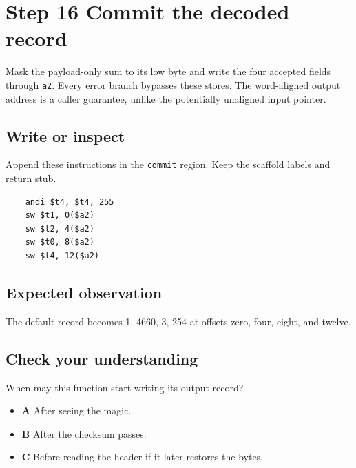 \section{Step 16 Commit the decoded record}\label{packet-s16}

Mask the payload-only sum to its low byte and write the four accepted fields through \texttt{a2}. Every error branch bypasses these stores. The word-aligned output address is a caller guarantee, unlike the potentially unaligned input pointer.

\subsection{Write or inspect}
Append these instructions in the \texttt{commit} region. Keep the scaffold labels and return stub.

\begin{verbatim}
    andi $t4, $t4, 255
    sw $t1, 0($a2)
    sw $t2, 4($a2)
    sw $t0, 8($a2)
    sw $t4, 12($a2)
\end{verbatim}

\subsection{Expected observation}
The default record becomes 1, 4660, 3, 254 at offsets zero, four, eight, and twelve.

\subsection{Check your understanding}
When may this function start writing its output record?

\begin{itemize}
  \item \textbf{A} After seeing the magic.
  \item \textbf{B} After the checksum passes.
  \item \textbf{C} Before reading the header if it later restores the bytes.
\end{itemize}
